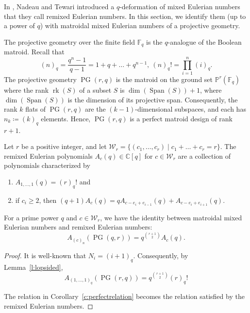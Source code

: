 \documentclass[ALCO,published]{cedram}
\numberwithin{equation}{section}
\numberwithin{figure}{section}
\newcommand{\C}{\mathbb{C}}
\newcommand{\F}{\mathbb{F}}
\newcommand{\PP}{\mathbb{P}}
\newcommand{\cW}{\mathcal{W}}
\DeclareMathOperator{\Span}{Span}
\DeclareMathOperator{\PG}{PG}
\DeclareMathOperator{\rk}{rk}
\begin{document}
In \cite{NT:Klyachko,NT:remixed}, Nadeau and Tewari introduced a $q$-deformation of mixed Eulerian numbers that they call remixed Eulerian numbers. In this section, we identify them (up to a power of $q$) with matroidal mixed Eulerian numbers of a projective geometry.

The projective geometry over the finite field $\F_q$ is the $q$-analogue of the Boolean matroid. 
Recall that 
\[(n)_q=\frac{q^n-1}{q-1}=1+q+\dots+q^{n-1},\ (n)_q!=\prod_{i=1}^n (i)_q.\]
The projective geometry $\PG(r,q)$ is the matroid on the ground set $\PP^r(\F_q)$ where the rank $\rk(S)$  of a subset $S$ is $\dim(\Span(S))+1$, where $\dim(\Span(S))$ is the dimension of its projective span. Consequently, the rank $k$ flats of $\PG(r,q)$ are the $(k-1)$-dimensional subspaces, and each has $n_k\coloneqq (k)_q$ elements. Hence, $\PG(r,q)$ is a perfect matroid design of rank $r+1$.


\begin{defi}
  Let $r$ be a positive integer, and let $\cW_r=\{(c_1,\dots,c_r)\mid c_1+\dots+c_r=r\}$. The remixed Eulerian polynomials $A_c(q)\in\C[q]$ for $c\in \cW_r$ are a collection of polynomials characterized by
  \begin{enumerate}
      \item $A_{1,\dots,1}(q)=(r)_q!$ and
      \item if $c_i\geq 2$, then $(q+1)A_c(q)=qA_{c-e_i+e_{i-1}}(q)+A_{c-e_i+e_{i+1}}(q).$
  \end{enumerate}
\end{defi}

\begin{theorem} For a prime power $q$ and $c\in\cW_r$, we have the identity between matroidal mixed Eulerian numbers and remixed Eulerian numbers: 
\[A_{(c)_n}(\PG(q,r))=q^{\binom{r+1}{2}}A_c(q).\]
\end{theorem}

\begin{proof}
  It is well-known that $N_i=(i+1)_q$. Consequently, by Lemma~\ref{l:lopsided},
  \[A_{(1,\dots,1)_q}(\PG(r,q))=q^{\binom{r+1}{2}}(r)_q!\]

  The relation in Corollary~\ref{c:perfectrelation} becomes the relation satisfied by the remixed Eulerian numbers.
\end{proof}
\end{document}
